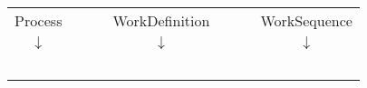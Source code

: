   \begin{tabular}{ccccc}
  Process & & WorkDefinition & & WorkSequence \\
    $\downarrow$ & & $\downarrow$ & & $\downarrow$ \\
    \begingroup
\tikzset{every picture/.style={scale=0.7}}%
     
\endgroup
    & ~~~ &
    \begingroup
\tikzset{every picture/.style={scale=0.6}}%
     
\endgroup
    & ~~~ &
    \begingroup
\tikzset{every picture/.style={scale=0.6}}%
    
\endgroup
    \\
    \end{tabular}
